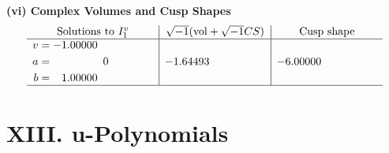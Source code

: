 \documentclass[1p]{elsarticle_modified}
\theoremstyle{definition}
\newcommand{\I}{\sqrt{-1}}
\begin{document}
\newpage\flushleft \textbf{(vi) Complex Volumes and Cusp Shapes}
$$\begin{array}{c|c|c}  
\text{Solutions to }I^v_{1}& \I (\text{vol} + \sqrt{-1}CS) & \text{Cusp shape}\\
 \hline 
\begin{aligned}
v &= -1.00000\phantom{ +0.000000I} \\
a &= \phantom{-0.000000 } 0 \\
b &= \phantom{-}1.00000\phantom{ +0.000000I}\end{aligned}
 & -1.64493\phantom{ +0.000000I} & -6.00000\phantom{ +0.000000I}\\
 \hline 
 \end{array}$$\newpage
\newpage\renewcommand{\arraystretch}{1}
\centering \section*{ XIII. u-Polynomials}
\end{document}
